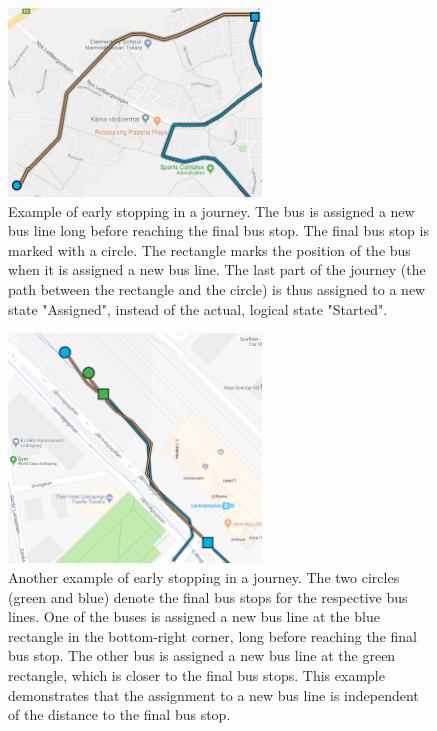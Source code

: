 \begin{figure}[t]
    \centering
    \includegraphics[width=0.6\textwidth]{figures/assigned_completed_problem_long}
    \caption[Example of early stopping in a journey]
    {\small Example of early stopping in a journey.
    The bus is assigned a new bus line long before reaching the final bus stop.
    The final bus stop is marked with a circle.
    The rectangle marks the position of the bus when it is assigned a new bus line.
    The last part of the journey (the path between the rectangle and the circle) is thus assigned to a new state "Assigned", instead of the actual, logical state "Started".}
    \label{fig:assigned-before-completed-long}
\end{figure}

\begin{figure}[t]
    \centering
    \includegraphics[width=0.6\textwidth]{figures/assigned_completed_problem}
    \caption[Another example of early stopping in a journey]
    {\small Another example of early stopping in a journey.
    The two circles (green and blue) denote the final bus stops for the respective bus lines.
    One of the buses is assigned a new bus line at the blue rectangle in the bottom-right corner, long before reaching the final bus stop.
    The other bus is assigned a new bus line at the green rectangle, which is closer to the final bus stops.
    This example demonstrates that the assignment to a new bus line is independent of the distance to the final bus stop.}
    \label{fig:assigned-before-completed}
\end{figure}

